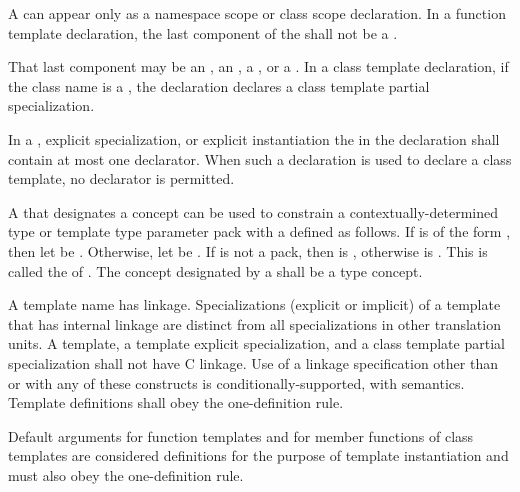 \pnum
A
can appear only as a namespace scope or class scope declaration.
In a function template declaration, the last component of the
shall not be a
.
\begin{note}
That last component may be an , an ,
a , or a . In
a class template declaration, if the
class name
is a
,
the declaration declares a class template partial specialization.
\end{note}

\pnum
In a
,
explicit specialization, or explicit instantiation the
in the declaration shall contain at most one declarator.
When such a declaration is used to declare a class template,
no declarator is permitted.

\pnum
A   that designates a concept 
can be used to constrain a
contextually-determined type or template type parameter pack 
with a   defined as follows.
If  is of the form ,
then let  be .
Otherwise, let  be .
If  is not a pack,
then  is ,
otherwise  is .
This   is called the
of .
The concept designated by a 
shall be a type concept.

\pnum
{}%
A template name has linkage.
Specializations (explicit or implicit) of
a template that has internal linkage are
distinct from all specializations in other translation
units.
A template, a template explicit specialization, and a class
template partial specialization shall not have C linkage. Use of a linkage specification
other than  or  with any of these constructs is
conditionally-supported, with
 semantics.
Template definitions shall obey the one-definition rule.
\begin{note}
Default arguments for function templates and for member functions of
class templates are considered definitions for the purpose of template
instantiation and must also obey the one-definition rule.
\end{note}

